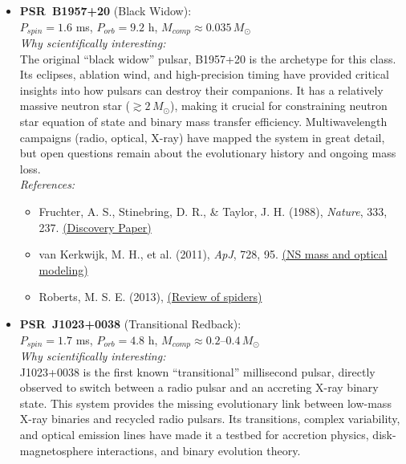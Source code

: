 \documentclass[12pt]{article}
\begin{document}
\vspace{1em}
\begin{itemize}
    \item \textbf{PSR~B1957+20} (Black Widow):\\
    $P_{spin}=1.6$ ms, $P_{orb}=9.2$ h, $M_{comp}\approx0.035\,M_\odot$\\
    
    \textit{Why scientifically interesting:}\\
    The original ``black widow'' pulsar, B1957+20 is the archetype for this class. Its eclipses, ablation wind, and high-precision timing have provided critical insights into how pulsars can destroy their companions. It has a relatively massive neutron star ($\gtrsim 2\,M_\odot$), making it crucial for constraining neutron star equation of state and binary mass transfer efficiency. Multiwavelength campaigns (radio, optical, X-ray) have mapped the system in great detail, but open questions remain about the evolutionary history and ongoing mass loss.\\
    
    \textit{References:}
    \begin{itemize}
        \item Fruchter, A. S., Stinebring, D. R., \& Taylor, J. H. (1988), \textit{Nature}, 333, 237. \href{https://www.nature.com/articles/333237a0}{(Discovery Paper)}
        \item van Kerkwijk, M. H., et al. (2011), \textit{ApJ}, 728, 95. \href{https://iopscience.iop.org/article/10.1088/0004-637X/728/2/95}{(NS mass and optical modeling)}
        \item Roberts, M. S. E. (2013), \href{https://arxiv.org/abs/1210.6903}{(Review of spiders)}
    \end{itemize}
    \vspace{0.5em}
    
    \item \textbf{PSR~J1023+0038} (Transitional Redback):\\
    $P_{spin}=1.7$ ms, $P_{orb}=4.8$ h, $M_{comp}\approx0.2$--$0.4\,M_\odot$\\
    
    \textit{Why scientifically interesting:}\\
    J1023+0038 is the first known ``transitional'' millisecond pulsar, directly observed to switch between a radio pulsar and an accreting X-ray binary state. This system provides the missing evolutionary link between low-mass X-ray binaries and recycled radio pulsars. Its transitions, complex variability, and optical emission lines have made it a testbed for accretion physics, disk-magnetosphere interactions, and binary evolution theory.\\
    

\end{itemize}
\end{document}
